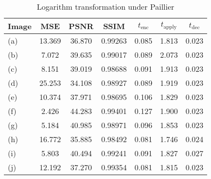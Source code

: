 \begin{table}[!ht]
	\centering
	\caption{Logarithm transformation under Paillier}
	\label{tbl:log-pal}
    \begin{tabular}{lcccccc}
        \toprule
        Image & MSE  & PSNR & SSIM & $t_\text{enc}$ & $t_\text{apply}$ & $t_\text{dec}$ \\ \midrule
		(a) & 13.369 & 36.870 & 0.99263 & 0.085 & 1.813 & 0.023 \\
		(b) & 7.072 & 39.635 & 0.99017 & 0.089 & 2.073 & 0.023 \\
		(c) & 8.151 & 39.019 & 0.98688 & 0.091 & 1.913 & 0.023 \\
		(d) & 25.253 & 34.108 & 0.98927 & 0.089 & 1.919 & 0.023 \\
		(e) & 10.374 & 37.971 & 0.98695 & 0.106 & 1.829 & 0.023 \\
		(f) & 2.426 & 44.283 & 0.99401 & 0.127 & 1.900 & 0.023 \\
		(g) & 5.184 & 40.985 & 0.98971 & 0.096 & 1.853 & 0.023 \\
		(h) & 16.772 & 35.885 & 0.98492 & 0.081 & 1.746 & 0.024 \\
		(i) & 5.803 & 40.494 & 0.99241 & 0.091 & 1.827 & 0.027 \\
		(j) & 12.192 & 37.270 & 0.99354 & 0.081 & 1.815 & 0.023 \\
		\bottomrule
        \end{tabular}
\end{table}
